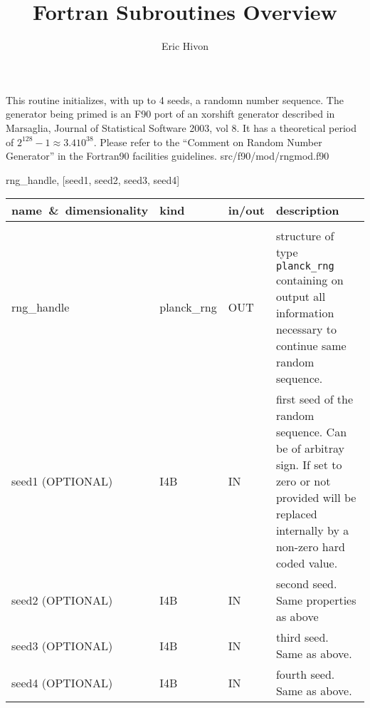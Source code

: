 
\sloppy


\title{\healpix Fortran Subroutines Overview}
 \section[rand\_init]{ }
\label{sub:rand_init}
\author{Eric Hivon}

\begin{facility}
{This routine initializes, with up to 4 seeds, a randomn number sequence. 
 The generator being primed is an F90 port of an xorshift generator described
  in Marsaglia, Journal of Statistical Software 2003, vol 8.
  It has a theoretical period of $2^{128} - 1 \approx 3.4 10^{38}$.
Please refer to the ``Comment on Random Number Generator''
  in the Fortran90 facilities guidelines.
}
{src/f90/mod/rngmod.f90}
\end{facility}

\begin{f90format}
{rng\_handle, [seed1, seed2, seed3, seed4]}
\end{f90format}

\begin{arguments}
{
\begin{tabular}{p{0.3\hsize} p{0.15\hsize} p{0.1\hsize} p{0.35\hsize}} \hline  
\textbf{name~\&~dimensionality} & \textbf{kind} & \textbf{in/out} & \textbf{description} \\ \hline
                   &   &   &                           \\ %
rng\_handle & planck\_rng & OUT & structure of type {\tt planck\_rng}
                   containing on output all information necessary to continue same random sequence. \\ 
seed1 (OPTIONAL)& I4B & IN & first seed of the random sequence. Can be of arbitray
                   sign. If set to
                   zero or not provided will be replaced internally by a non-zero hard coded value.   \\
seed2 (OPTIONAL)& I4B & IN & second seed. Same properties as above  \\
seed3 (OPTIONAL)& I4B & IN & third seed. Same as above.  \\
seed4 (OPTIONAL)& I4B & IN & fourth seed. Same as above.  \\
\end{tabular}
}
\end{arguments}

